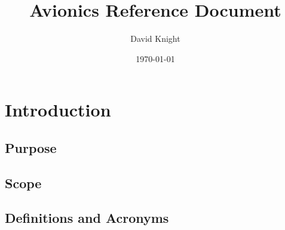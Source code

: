 \documentclass{article}
\title{Avionics Reference Document}
\author{David Knight}
\date{\today}
\begin{document}
\maketitle
\newpage

\tableofcontents
\newpage
\listoftables
\newpage
\listoffigures
\newpage

\section{Introduction}
\subsection{Purpose}
\subsection{Scope}
\subsection{Definitions and Acronyms}
\newpage

\pagebreak




\end{document}
